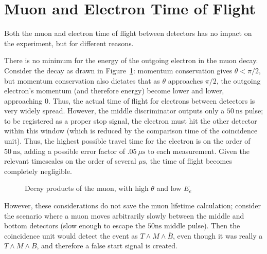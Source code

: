 \section{Muon and Electron Time of Flight}
\label{timeofflight}

Both the muon and electron time of flight between detectors has no impact on the experiment, but for different reasons.

There is no minimum for the energy of the outgoing electron in the muon decay. Consider the decay as drawn in Figure~\ref{figure:electronpi}: momentum conservation gives $\theta < \pi/2$, but momentum conservation also dictates that as $\theta$ approaches $\pi/2$, the outgoing electron's momentum (and therefore energy) become lower and lower, approaching $0$. Thus, the actual time of flight for electrons between detectors is very widely spread. However, the middle discriminator outputs only a $50~\mathrm{ns}$ pulse; to be registered as a proper stop signal, the electron must hit the other detector within this window (which is reduced by the comparison time of the coincidence unit). Thus, the highest possible travel time for the electron is on the order of $50~\mathrm{ns}$, adding a possible error factor of $.05~\mu\mathrm{s}$ to each measurement. Given the relevant timescales on the order of several $\mu\mathrm{s}$, the time of flight becomes completely negligible.

\begin{figure}[htbp]
\begin{center}
 

 
\caption{\small{Decay products of the muon, with high $\theta$ and low $E_{e}$}}
\label{figure:electronpi}
\end{center}
\end{figure}

However, these considerations do not save the muon lifetime calculation; consider the scenario where a muon moves arbitrarily slowly between the middle and bottom detectors (slow enough to escape the $50 \mathrm{ns}$ middle pulse). Then the coincidence unit would detect the event as $T \wedge M \wedge \bar{B}$, even though it was really a $T \wedge M \wedge B$, and therefore a false start signal is created.

